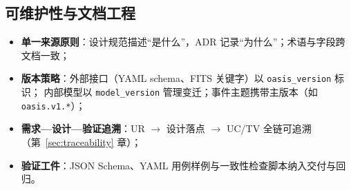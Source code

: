 \subsection{可维护性与文档工程}

\begin{itemize}
  \item \textbf{单一来源原则}：设计规范描述“是什么”，ADR 记录“为什么”；术语与字段跨文档一致；
  \item \textbf{版本策略}：外部接口（YAML schema、FITS 关键字）以 \texttt{oasis\_version} 标识；
        内部模型以 \texttt{model\_version} 管理变迁；事件主题携带主版本（如 \texttt{oasis.v1.*}）；
  \item \textbf{需求—设计—验证追溯}：UR $\rightarrow$ 设计落点 $\rightarrow$ UC/TV 全链可追溯（第~\ref{sec:traceability} 章）；
  \item \textbf{验证工件}：JSON Schema、YAML 用例样例与一致性检查脚本纳入交付与回归。
\end{itemize}
